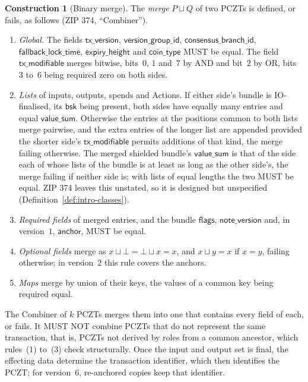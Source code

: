 \documentclass[11pt,a4paper]{article}
\theoremstyle{definition}
\newtheorem{construction}[theorem]{Construction}
\begin{document}
\begin{construction}[Binary merge]\label{def:pczt-merge}
The \emph{merge} $P \sqcup Q$ of two PCZTs is defined, or fails, as
follows (ZIP 374, ``Combiner'').
\begin{enumerate}[label=(\arabic*)]
\item \emph{Global.} The fields $\mathsf{tx\_version}$,
  $\mathsf{version\_group\_id}$,
  $\mathsf{consensus\_}\allowbreak\mathsf{branch\_id}$,
  $\mathsf{fallback\_lock\_time}$, $\mathsf{expiry\_height}$ and
  $\mathsf{coin\_type}$ MUST be equal. The field $\mathsf{tx\_modifiable}$
  merges bitwise, bits~$0$, $1$ and~$7$ by AND and bit~$2$ by OR, bits~$3$
  to~$6$ being required zero on both sides.
\item \emph{Lists} of inputs, outputs, spends and Actions. If either side's
  bundle is IO-finalised, its $\mathsf{bsk}$ being present, both sides have
  equally many entries and equal $\mathsf{value\_sum}$. Otherwise the
  entries at the positions common to both lists merge pairwise, and the
  extra entries of the longer list are appended provided the shorter
  side's $\mathsf{tx\_modifiable}$ permits additions of that kind, the
  merge failing otherwise. The merged shielded bundle's
  $\mathsf{value\_sum}$ is that of the side each of whose lists of the
  bundle is at least as long as the other side's, the merge failing if
  neither side is; with lists of equal lengths the two MUST be equal.
  ZIP 374 leaves this unstated, so it is designed but unspecified
  (Definition~\ref{def:intro-classes}).
\item \emph{Required fields} of merged entries, and the bundle
  $\mathsf{flags}$, $\mathsf{note\_version}$ and, in version~$1$,
  $\mathsf{anchor}$, MUST be equal.
\item \emph{Optional fields} merge as $x \sqcup \bot = \bot \sqcup x = x$,
  and $x \sqcup y = x$ if $x = y$, failing otherwise; in version~$2$ this
  rule covers the anchors.
\item \emph{Maps} merge by union of their keys, the values of a common key
  being required equal.
\end{enumerate}
The Combiner of $k$ PCZTs merges them into one that contains every field of
each, or fails. It MUST NOT combine PCZTs that do not represent the same
transaction, that is, PCZTs not derived by roles from a common ancestor,
which rules~(1) to~(3) check structurally. Once the input and output set is
final, the effecting data determine the transaction identifier, which then
identifies the PCZT; for version~$6$, re-anchored copies keep that
identifier.
\end{construction}
\end{document}
